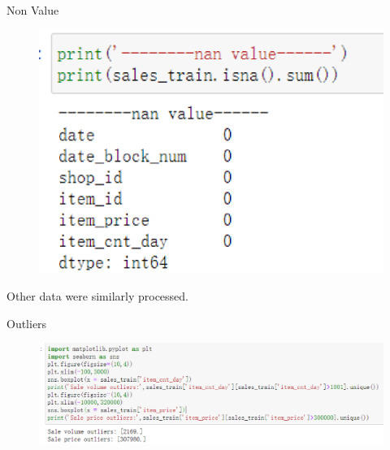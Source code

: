 \documentclass[
 size=14pt,
 paper=smartboard,  %
 mode=present, 		%
 display=slides, 	%
 style=tuliplab,  	%
 pauseslide,
 fleqn,leqno]{powerdot}
\begin{document}
\begin{slide}[toc=,bm=]{Non Value}
  \begin{figure}
    \includegraphics[scale=0.5]{picture/data_4.eps}
  \end{figure}
  Other data were similarly processed.
\end{slide}

\begin{slide}[toc=,bm=]{Outliers}
  \begin{figure}
    \includegraphics[scale=0.5]{picture/data_6.eps}
  \end{figure}
\end{slide}
\end{document}
